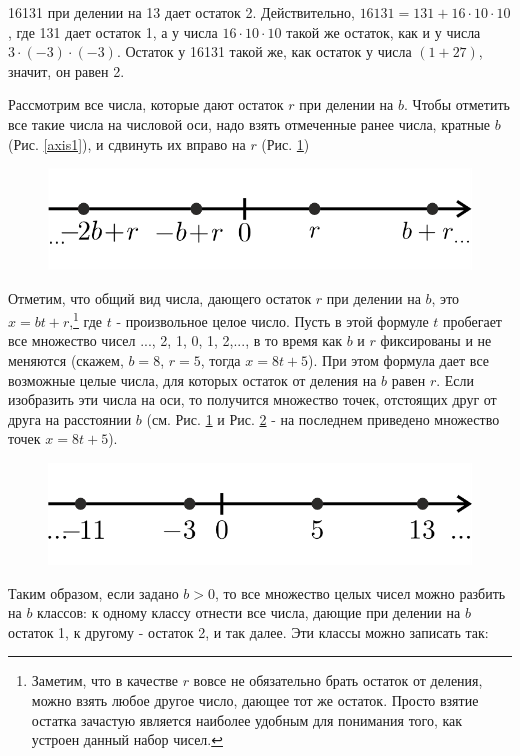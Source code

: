 \begin{samp}
16131 при делении на 13 дает остаток 2. Действительно,   $16131 = 131 + 16\cdot10\cdot10$,    где 131 дает остаток 1,  а у числа $16\cdot10\cdot10$ такой же остаток, как и у числа  $3\cdot(-3)\cdot(-3)$. Остаток у 16131 такой же, как остаток у числа $(1+27)$, значит, он равен 2.
\end{samp}

Рассмотрим все числа, которые дают остаток $r$ при делении на $b$. Чтобы отметить все такие числа на числовой оси, надо взять отмеченные ранее числа, кратные $b$ (Рис. \ref{axis1}), и сдвинуть их вправо на $r$ (Рис. \ref{axis3})

\begin{figure}[h]
  \centering
\includegraphics[width=.5\linewidth]{./img/axis3}
  \caption{}
  \label{axis3}
\end{figure}

Отметим, что общий вид числа, дающего остаток $r$ при делении на $b$, это $x = bt + r$,\footnote{Заметим, что в качестве $r$ вовсе не обязательно брать остаток от деления, можно взять любое другое число, дающее тот же остаток. Просто взятие остатка зачастую является наиболее удобным для понимания того, как устроен данный набор чисел.} где $t$ - произвольное целое число. Пусть в этой формуле $t$ пробегает все множество чисел {..., 2, 1, 0, 1, 2,...}, в то время как $b$ и $r$ фиксированы и не меняются (скажем, $b=8$,  $r=5$, тогда $x=8t+5$). При этом формула дает все возможные целые числа, для которых остаток от деления на $b$ равен $r$. Если изобразить эти числа на оси, то получится множество точек, отстоящих друг от друга на расстоянии $b$ (см. Рис. \ref{axis3} и Рис. \ref{axis4} - на последнем приведено множество точек $x=8t+5$).

\begin{figure}[h]
  \centering
\includegraphics[width=.5\linewidth]{./img/axis4}
  \caption{}
  \label{axis4}
\end{figure}

Таким образом, если задано $b > 0$, то все множество целых чисел можно разбить на $b$ классов: к одному классу отнести все числа, дающие при делении на $b$ остаток 1, к другому - остаток 2, и так далее. Эти классы можно записать так:

